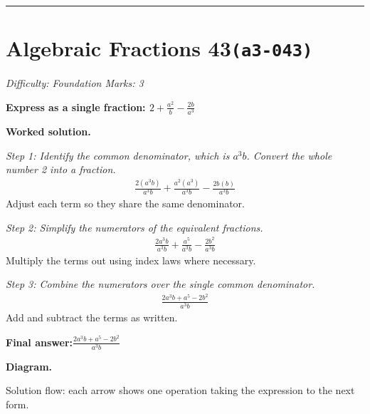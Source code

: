 \documentclass[11pt]{article}
\newcommand{\question}[1]{\par\medskip\noindent\textbf{#1}\par}
\begin{document}
\medskip\hrule

\section*{Algebraic Fractions 43\quad\small\texttt{(a3-043)}}
\textit{Difficulty: Foundation \quad\textbar\quad Marks: 3}

\question{Express as a single fraction: \( 2 + \frac{a^2}{b} - \frac{2b}{a^3} \)}

\textbf{Worked solution.}

\textit{Step 1: Identify the common denominator, which is \( a^3b \). Convert the whole number 2 into a fraction.}
\[\begin{gathered}
\frac{2(a^3b)}{a^3b} + \frac{a^2(a^3)}{a^3b} - \frac{2b(b)}{a^3b}
\end{gathered}\]
Adjust each term so they share the same denominator.

\textit{Step 2: Simplify the numerators of the equivalent fractions.}
\[\begin{gathered}
\frac{2a^3b}{a^3b} + \frac{a^5}{a^3b} - \frac{2b^2}{a^3b}
\end{gathered}\]
Multiply the terms out using index laws where necessary.

\textit{Step 3: Combine the numerators over the single common denominator.}
\[\begin{gathered}
\frac{2a^3b + a^5 - 2b^2}{a^3b}
\end{gathered}\]
Add and subtract the terms as written.

\begin{answerbox}
\textbf{Final answer:}\quad \(\displaystyle \frac{2a^3b + a^5 - 2b^2}{a^3b}\)
\end{answerbox}
\textbf{Diagram.}

\begin{center}
\end{center}
\small Solution flow: each arrow shows one operation taking the expression to the next form.\normalsize
\end{document}
